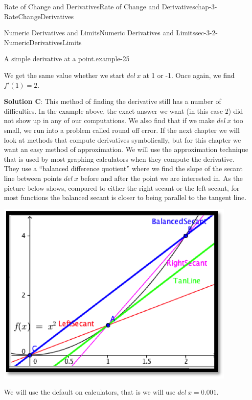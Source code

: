 \documentclass[oneside,10pt,]{book}
\newcommand{\terminology}[1]{\textbf{#1}}
\numberwithin{equation}{section}
\begin{document}
\begin{chapterptx}{Rate of Change and Derivatives}{}{Rate of Change and Derivatives}{}{}{chap-3-RateChangeDerivatives}
\begin{sectionptx}{Numeric Derivatives and Limits}{}{Numeric Derivatives and Limits}{}{}{sec-3-2-NumericDerivativesLimits}
\begin{example}{A simple derivative at a point.}{example-25}
\begin{sidebyside}{1}{0.15}{0.15}{0}
\begin{sbspanel}{0.7}
\end{sbspanel}%
\end{sidebyside}%
\par
\hypertarget{p-1028}{}%
We get the same value whether we start \(del\ x\) at 1 or -1.  Once again, we find \(f'(1)=2\).%
\par
\hypertarget{p-1029}{}%
\terminology{Solution C}: This method of finding the derivative still has a number of difficulties.  In the example above, the exact answer we want (in this case 2) did not show up in any of our computations.  We also find that if we make \(del\ x\) too small, we run into a problem called round off error.  If the next chapter we will look at methods that compute derivatives symbolically, but for this chapter we want an easy method of approximation.  We will use the approximation technique that is used by most graphing calculators when they compute the derivative.  They use a ``balanced difference quotient'' where we find the slope of the secant line between points \(del\ x\) before and after the point we are interested in. As the picture below shows, compared to either the right secant or the left secant, for most functions the balanced secant is closer to being parallel to the tangent line.%
\begin{sidebyside}{1}{0.15}{0.15}{0}%
\begin{sbspanel}{0.7}%
\includegraphics[width=1\linewidth]{images/sec3-2-5.png}
\end{sbspanel}%
\end{sidebyside}%
\par
\hypertarget{p-1030}{}%
We will use the default on calculators, that is we will use \(del\ x = 0.001\).%

\end{example}
\end{sectionptx}
\end{chapterptx}
\end{document}
